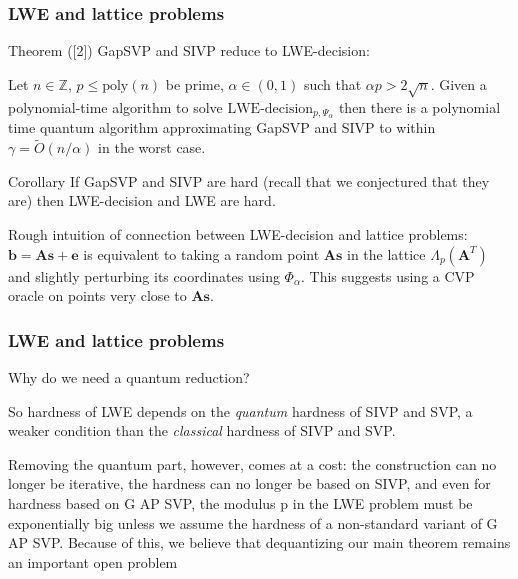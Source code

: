 \documentclass{beamer}
\renewcommand{\v}{\mathbf}
\begin{document}
\begin{frame}
\frametitle{LWE and lattice problems}
\begin{block}{Theorem ([2])}
GapSVP and SIVP reduce to LWE-decision:

Let $n \in \mathbb{Z}$, $p \leq \text{poly}(n)$ be prime,
$\alpha \in (0,1)$ such that $\alpha p > 2 \sqrt{n}$.
Given a polynomial-time algorithm to solve $\text{LWE-decision}_{p,\Psi_\alpha}$ then there is a polynomial time quantum algorithm 
approximating GapSVP and SIVP to within $\gamma = \tilde{O}(n/\alpha)$
in the worst case.
\end{block}
\begin{block}{Corollary}
    If GapSVP and SIVP are hard (recall that we conjectured that they are)
    then LWE-decision and LWE are hard.
\end{block}
\smallskip
Rough intuition of connection between LWE-decision and lattice problems:
$\v{b} = \v{As + e}$ is equivalent to taking a random point $\v{As}$ in the
lattice $\Lambda_p(\v{A}^T)$ and slightly perturbing its coordinates
using $\Phi_\alpha$. This suggests using a CVP oracle on points
very close to $\v{As}$.
\end{frame}

\begin{frame}
\frametitle{LWE and lattice problems}
Why do we need a quantum reduction?

\end{frame}
\begin{frame}
    So hardness of LWE depends on the \textit{quantum} hardness of
    SIVP and SVP, a weaker condition than the \textit{classical}
    hardness of SIVP and SVP.

Removing the quantum part, however, comes at a cost: the construction can no longer be iterative,
the hardness can no longer be based on SIVP, and even for hardness based on G AP SVP, the modulus p
in the LWE problem must be exponentially big unless we assume the hardness of a non-standard variant
of G AP SVP. Because of this, we believe that dequantizing our main theorem remains an important open
problem
\end{frame}
\end{document}
